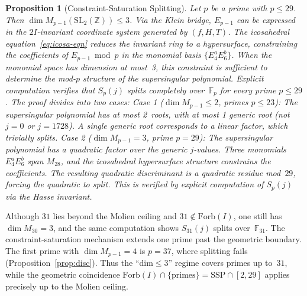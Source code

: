 \documentclass[11pt,letterpaper]{article}
\newtheorem{proposition}[theorem]{Proposition}
\theoremstyle{definition}
\newcommand{\Forb}{\mathrm{Forb}}
\newcommand{\SSP}{\mathrm{SSP}}
\newcommand{\ZZ}{\mathbb{Z}}
\newcommand{\FF}{\mathbb{F}}
\begin{document}
\begin{proposition}[Constraint-Saturation Splitting]\label{prop:splitting}
Let $p$ be a prime with $p\le 29$.  Then $\dim M_{p-1}(\mathrm{SL}_2(\ZZ))\le 3$.  Via the Klein bridge, $E_{p-1}$ can be expressed in the $2I$-invariant coordinate system generated by $(f,H,T)$.  The icosahedral equation~\eqref{eq:icosa-eqn} reduces the invariant ring to a hypersurface, constraining the coefficients of $E_{p-1}\bmod p$ in the monomial basis $\{E_4^aE_6^b\}$.  When the monomial space has dimension at most~3, this constraint is sufficient to determine the mod-$p$ structure of the supersingular polynomial.  Explicit computation verifies that $S_p(j)$ splits completely over~$\FF_p$ for every prime $p\le 29$.
The proof divides into two cases:
\textup{Case 1} \textup{(}$\dim M_{p-1}\le 2$, primes $p\le 23$\textup{):} The supersingular polynomial has at most 2~roots, with at most 1 generic root \textup{(}not $j=0$ or $j=1728$\textup{)}.  A single generic root corresponds to a linear factor, which trivially splits.
\textup{Case 2} \textup{(}$\dim M_{p-1}=3$, prime $p=29$\textup{):} The supersingular polynomial has a quadratic factor over the generic $j$-values.  Three monomials $E_4^a E_6^b$ span $M_{28}$, and the icosahedral hypersurface structure constrains the coefficients.  The resulting quadratic discriminant is a quadratic residue mod~$29$, forcing the quadratic to split.  This is verified by explicit computation of $S_p(j)$ via the Hasse invariant.
\end{proposition}
\begin{remarkbox}[Remark: The $p=31$ spillover]
Although $31$ lies beyond the Molien ceiling and $31\notin\Forb(I)$, one still has $\dim M_{30}=3$, and the same computation shows $S_{31}(j)$ splits over~$\FF_{31}$.  The constraint-saturation mechanism extends one prime past the geometric boundary.  The first prime with $\dim M_{p-1}=4$ is $p=37$, where splitting fails \textup{(Proposition~\ref{prop:disc})}.  Thus the ``dim$\le3$'' regime covers primes up to~$31$, while the geometric coincidence $\Forb(I)\cap\{\text{primes}\}=\SSP\cap[2,29]$ applies precisely up to the Molien ceiling.
\end{remarkbox}
\end{document}
